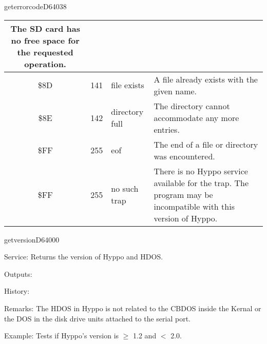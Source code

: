 \begin{hyppotrap}{geterrorcode}{D640}{38}
{\begin{longtable}{|c|r|l|p{8cm}|}
    The SD card has no free space for the requested operation.
    \\\hline
    \index{Hyppo Error Codes!\$8D}
    \$8D & 141 & file exists &
    A file already exists with the given name.
    \\\hline
    \index{Hyppo Error Codes!\$8E}
    \$8E & 142 & directory full &
    The directory cannot accommodate any more entries.
    \\\hline
    \index{Hyppo Error Codes!\$FF}
    \$FF & 255 & eof &
    The end of a file or directory was encountered.
    \\\hline
    \index{Hyppo Error Codes!\$FF}
    \$FF & 255 & no such trap &
    There is no Hyppo service available for the trap. The program may be
    incompatible with this version of Hyppo.
    \\\hline
  \end{longtable}
}
\end{hyppotrap}


\newpage
\begin{hyppotrap}{getversion}{D640}{00}
\item [Service:]
  Returns the version of Hyppo and HDOS.
\item [Outputs:]
\item [History:]
\item [Remarks:]
  The HDOS in Hyppo is not related to the CBDOS inside the Kernal or the
  DOS in the disk drive units attached to the serial port.
\item [Example:]
  Tests if Hyppo's version is $\geq$ 1.2 and $<$ 2.0.
\end{hyppotrap}



